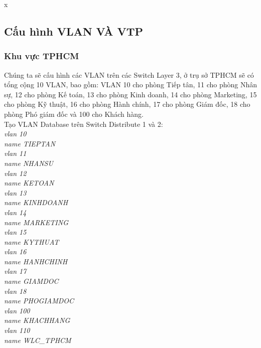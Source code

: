 \documentclass[12pt,a4paper]{report}
\begin{document}
x\subsection{Cấu hình VLAN VÀ VTP}
\subsubsection{Khu vực TPHCM}
\hspace*{1cm}Chúng ta sẽ cấu hình các VLAN trên các Switch Layer 3, ở trụ sở TPHCM sẽ có tổng cộng 10 VLAN, bao gồm: VLAN 10 cho phòng Tiếp tân, 11 cho phòng Nhân sự, 12 cho phòng Kế toán, 13 cho phòng Kinh doanh, 14 cho phòng Marketing, 15 cho phòng Kỹ thuật, 16 cho phòng Hành chính, 17 cho phòng Giám đốc, 18 cho phòng Phó giám đốc và 100 cho Khách hàng.\\
\hspace*{1cm}Tạo VLAN Database trên Switch Distribute 1 và 2:\\
\hspace*{2cm}\textit{vlan 10\\
\hspace*{2cm}name TIEPTAN\\
\hspace*{2cm}vlan 11\\
\hspace*{2cm}name NHANSU\\
\hspace*{2cm}vlan 12\\
\hspace*{2cm}name KETOAN\\
\hspace*{2cm}vlan 13\\
\hspace*{2cm}name KINHDOANH \\
\hspace*{2cm}vlan 14\\
\hspace*{2cm}name MARKETING\\
\hspace*{2cm}vlan 15\\
\hspace*{2cm}name KYTHUAT\\
\hspace*{2cm}vlan 16\\
\hspace*{2cm}name HANHCHINH \\
\hspace*{2cm}vlan 17\\
\hspace*{2cm}name GIAMDOC\\
\hspace*{2cm}vlan 18\\
\hspace*{2cm}name PHOGIAMDOC \\
\hspace*{2cm}vlan 100\\
\hspace*{2cm}name KHACHHANG\\
\hspace*{2cm}vlan 110\\
\hspace*{2cm}name WLC\_TPHCM\\}
\end{document}

